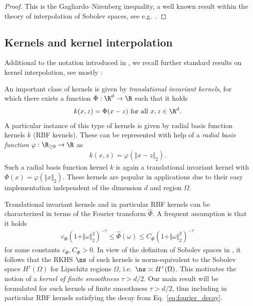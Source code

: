\documentclass[a4paper, 10pt]{article}
\begin{document}
\begin{proof}
This is the Gagliardo–Nirenberg inequality, a well known result within the theory of interpolation of Sobolev spaces, 
see e.g.\ \cite[Theorem 1]{brezis2018gagliardo}.
%
\end{proof}


\subsection{Kernels and kernel interpolation}
\label{subsec:kernel_approx}

Additional to the notation introduced in , 
we recall further standard results on kernel interpolation, see mostly \cite{wendland2005scattered}:

An important class of kernels is given by \textit{translational invariant kernels}, 
for which there exists a function $\Phi: \R^d \rightarrow \R$ such that it holds
\begin{align*}
k(x, z) = \Phi(x - z) ~ \text{for all} ~ x, z \in \R^d.
\end{align*}
A particular instance of this type of kernels is given by radial basis function kernels $k$ (RBF kernels).
These can be represented with help of a \textit{radial basis function} $\varphi: \R_{\geq 0} \rightarrow \R$ as
\begin{align*}
k(x, z) = \varphi(\Vert x - z \Vert_2).
\end{align*}
Such a radial basis function kernel $k$ is again a translational invariant kernel with $\Phi(x) = \varphi(\Vert x \Vert_2)$.
These kernels are popular in applications due to their easy implementation independent of the dimension $d$ and region $\Omega$.

Translational invariant kernels and in particular RBF kernels can be characterized in terms of the Fourier transform $\hat{\Phi}$.
A frequent assumption is that it holds
\begin{align}
\label{eq:fourier_decay}
c_\Phi (1+\Vert \omega \Vert_2^2)^{-\tau} \leq \hat{\Phi}(\omega) \leq C_\Phi (1 + \Vert \omega \Vert_2^2)^{-\tau}
\end{align}
for some constants $c_\Phi, C_\Phi > 0$.
In view of the definiton of Sobolev spaces in , 
it follows that the RKHS $\ns$ of such kernels is norm-equivalent to the Sobolev space $H^\tau(\Omega)$ for Lipschitz regions $\Omega$, i.e.\ $\ns \asymp H^\tau(\Omega)$.
This motivates the notion of a \textit{kernel of finite smoothness $\tau > d/2$}.
Our main result  will be formulated for such kernels of finite smoothness $\tau > d/2$, 
thus including in particular RBF kernels satisfying the decay from Eq.~\eqref{eq:fourier_decay}.
\end{document}
